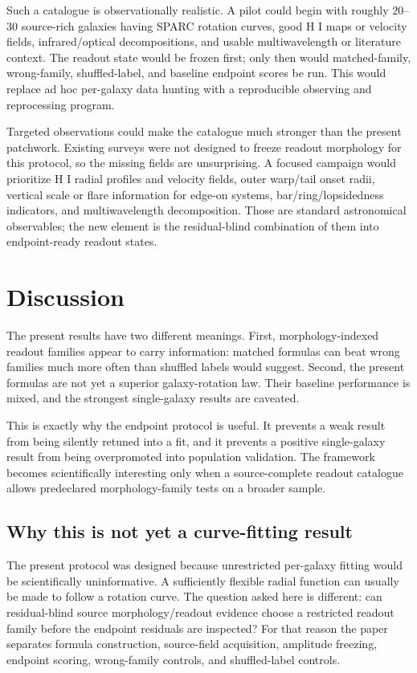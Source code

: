 \documentclass[11pt]{article}
\begin{document}
Such a catalogue is observationally realistic.  A pilot could begin with
roughly \(20\)--\(30\) source-rich galaxies having SPARC rotation curves, good H
I maps or velocity fields, infrared/optical decompositions, and usable
multiwavelength or literature context.  The readout state would be frozen first;
only then would matched-family, wrong-family, shuffled-label, and baseline
endpoint scores be run.  This would replace ad hoc per-galaxy data hunting with
a reproducible observing and reprocessing program.

Targeted observations could make the catalogue much stronger than the present
patchwork.  Existing surveys were not designed to freeze readout morphology for
this protocol, so the missing fields are unsurprising.  A focused campaign
would prioritize H I radial profiles and velocity fields, outer warp/tail onset
radii, vertical scale or flare information for edge-on systems,
bar/ring/lopsidedness indicators, and multiwavelength decomposition.  Those are
standard astronomical observables; the new element is the residual-blind
combination of them into endpoint-ready readout states.

\section{Discussion}

The present results have two different meanings.  First, morphology-indexed
readout families appear to carry information: matched formulas can beat wrong
families much more often than shuffled labels would suggest.  Second, the
present formulas are not yet a superior galaxy-rotation law.  Their baseline
performance is mixed, and the strongest single-galaxy results are caveated.

This is exactly why the endpoint protocol is useful.  It prevents a weak result
from being silently retuned into a fit, and it prevents a positive
single-galaxy result from being overpromoted into population validation.  The
framework becomes scientifically interesting only when a source-complete
readout catalogue allows predeclared morphology-family tests on a broader
sample.

\subsection{Why this is not yet a curve-fitting result}

The present protocol was designed because unrestricted per-galaxy fitting would
be scientifically uninformative.  A sufficiently flexible radial function can
usually be made to follow a rotation curve.  The question asked here is
different: can residual-blind source morphology/readout evidence choose a
restricted readout family before the endpoint residuals are inspected?  For
that reason the paper separates
formula construction, source-field acquisition, amplitude freezing, endpoint
scoring, wrong-family controls, and shuffled-label controls.
\end{document}
